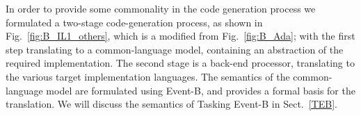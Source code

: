 %
In order to provide some commonality in the code generation process we formulated a two-stage code-generation process, as shown in Fig.~\ref{fig:B_IL1_others}, which is a modified from Fig.~\ref{fig:B_Ada}; with the first step translating to a common-language model, containing an abstraction of the required implementation. The second stage is a back-end processor, translating to the various target implementation languages. The semantics of the common-language model are formulated using Event-B, and provides a formal basis for the translation. We will discuss the semantics of Tasking Event-B in Sect.~\ref{TEB}.
